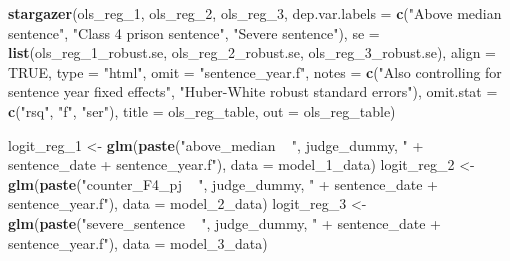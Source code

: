 \documentclass[
]{article}
\newenvironment{Shaded}{\begin{snugshade}}{\end{snugshade}}
\newcommand{\DataTypeTok}[1]{\textcolor[rgb]{0.13,0.29,0.53}{#1}}
\newcommand{\DecValTok}[1]{\textcolor[rgb]{0.00,0.00,0.81}{#1}}
\newcommand{\KeywordTok}[1]{\textcolor[rgb]{0.13,0.29,0.53}{\textbf{#1}}}
\newcommand{\NormalTok}[1]{#1}
\newcommand{\OtherTok}[1]{\textcolor[rgb]{0.56,0.35,0.01}{#1}}
\newcommand{\StringTok}[1]{\textcolor[rgb]{0.31,0.60,0.02}{#1}}
\begin{document}
\begin{Shaded}
\begin{Highlighting}[]
    \KeywordTok{stargazer}\NormalTok{(ols_reg_}\DecValTok{1}\NormalTok{, ols_reg_}\DecValTok{2}\NormalTok{, ols_reg_}\DecValTok{3}\NormalTok{, }\DataTypeTok{dep.var.labels =} \KeywordTok{c}\NormalTok{(}\StringTok{"Above median sentence"}\NormalTok{, }
        \StringTok{"Class 4 prison sentence"}\NormalTok{, }\StringTok{"Severe sentence"}\NormalTok{), }\DataTypeTok{se =} \KeywordTok{list}\NormalTok{(ols_reg_}\DecValTok{1}\NormalTok{_robust.se, }
\NormalTok{        ols_reg_}\DecValTok{2}\NormalTok{_robust.se, ols_reg_}\DecValTok{3}\NormalTok{_robust.se), }\DataTypeTok{align =} \OtherTok{TRUE}\NormalTok{, }\DataTypeTok{type =} \StringTok{"html"}\NormalTok{, }\DataTypeTok{omit =} \StringTok{"sentence_year.f"}\NormalTok{, }
        \DataTypeTok{notes =} \KeywordTok{c}\NormalTok{(}\StringTok{"Also controlling for sentence year fixed effects"}\NormalTok{, }\StringTok{"Huber-White robust standard errors"}\NormalTok{), }
        \DataTypeTok{omit.stat =} \KeywordTok{c}\NormalTok{(}\StringTok{"rsq"}\NormalTok{, }\StringTok{"f"}\NormalTok{, }\StringTok{"ser"}\NormalTok{), }\DataTypeTok{title =}\NormalTok{ ols_reg_table, }\DataTypeTok{out =}\NormalTok{ ols_reg_table)}
    
\NormalTok{    logit_reg_}\DecValTok{1}\NormalTok{ <-}\StringTok{ }\KeywordTok{glm}\NormalTok{(}\KeywordTok{paste}\NormalTok{(}\StringTok{"above_median ~ "}\NormalTok{, judge_dummy, }\StringTok{" + sentence_date + sentence_year.f"}\NormalTok{), }
        \DataTypeTok{data =}\NormalTok{ model_}\DecValTok{1}\NormalTok{_data)}
\NormalTok{    logit_reg_}\DecValTok{2}\NormalTok{ <-}\StringTok{ }\KeywordTok{glm}\NormalTok{(}\KeywordTok{paste}\NormalTok{(}\StringTok{"counter_F4_pj ~ "}\NormalTok{, judge_dummy, }\StringTok{" + sentence_date + sentence_year.f"}\NormalTok{), }
        \DataTypeTok{data =}\NormalTok{ model_}\DecValTok{2}\NormalTok{_data)}
\NormalTok{    logit_reg_}\DecValTok{3}\NormalTok{ <-}\StringTok{ }\KeywordTok{glm}\NormalTok{(}\KeywordTok{paste}\NormalTok{(}\StringTok{"severe_sentence ~ "}\NormalTok{, judge_dummy, }\StringTok{" + sentence_date + sentence_year.f"}\NormalTok{), }
        \DataTypeTok{data =}\NormalTok{ model_}\DecValTok{3}\NormalTok{_data)}
    

\end{Highlighting}
\end{Shaded}
\end{document}
